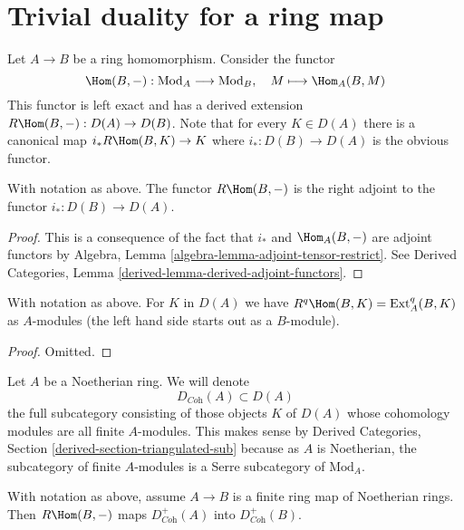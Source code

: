 \section{Trivial duality for a ring map}
\label{section-trivial}

\noindent
Let $A \to B$ be a ring homomorphism. Consider the functor
$$
\Hom(B, -) : \text{Mod}_A \longrightarrow \text{Mod}_B,\quad
M \longmapsto \Hom_A(B, M)
$$
This functor is left exact and has a derived extension
$R\Hom(B, -) : D(A) \to D(B)$. Note that for every $K \in D(A)$
there is a canonical map $i_*R\Hom(B, K) \to K$ where
$i_* : D(B) \to D(A)$ is the obvious functor.

\begin{lemma}
\label{lemma-right-adjoint}
With notation as above. The functor $R\Hom(B, -)$ is the
right adjoint to the functor $i_* : D(B) \to D(A)$.
\end{lemma}

\begin{proof}
This is a consequence of the fact that $i_*$ and $\Hom_A(B, -)$ are
adjoint functors by Algebra, Lemma \ref{algebra-lemma-adjoint-tensor-restrict}.
See Derived Categories, Lemma \ref{derived-lemma-derived-adjoint-functors}.
\end{proof}

\begin{lemma}
\label{lemma-RHom-ext}
With notation as above. For $K$ in $D(A)$ we have
$R^q\Hom(B, K) = \text{Ext}_A^q(B, K)$
as $A$-modules (the left hand side starts out as a $B$-module).
\end{lemma}

\begin{proof}
Omitted.
\end{proof}

\noindent
Let $A$ be a Noetherian ring. We will denote
$$
D_{\textit{Coh}}(A) \subset D(A)
$$
the full subcategory consisting of those objects $K$ of $D(A)$
whose cohomology modules are all finite $A$-modules. This makes sense
by Derived Categories, Section \ref{derived-section-triangulated-sub}
because as $A$ is Noetherian, the subcategory of finite $A$-modules
is a Serre subcategory of $\text{Mod}_A$.

\begin{lemma}
\label{lemma-exact-support-coherent}
With notation as above, assume $A \to B$ is a finite ring map of
Noetherian rings. Then $R\Hom(B, -)$ maps
$D^+_{\textit{Coh}}(A)$ into $D^+_{\textit{Coh}}(B)$.
\end{lemma}


